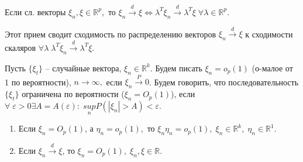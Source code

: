 \begin{lemma}\label{lec:14/lemm:1}
    Если сл. векторы $\xi_n, \xi \in \mathbb{R}^p,$ то $\xi_n \stackrel{d}{\to} \xi  \Longleftrightarrow \lambda^T\xi_n \stackrel{d}{\to} \lambda^T\xi \; \forall \lambda \in \mathbb{R}^p.$
\end{lemma}

Этот прием сводит сходимость по распределению векторов $\xi_n \stackrel{d}{\to} \xi$ к сходимости скаляров $\forall \lambda \; \lambda^T\xi_n \stackrel{d}{\to} \lambda^T\xi.$

\begin{conseq}
    Пусть $\lbrace \xi_t \rbrace$ -- случайные вектора, $\xi_n \in \mathbb{R}^k.$ Будем писать $\xi_n = o_p(1)$ (о-малое от 1 по вероятности), $n \to \infty,$ если $\xi_n \stackrel{P}{\to} 0$. 
    Будем говорить, что последовательность $\lbrace \xi_t \rbrace$ ограничена по вероятности  ($\xi_n = O_p(1)$), если $\forall \; \varepsilon > 0 \exists A = A(\varepsilon): \; \underset{n}{sup}P(|\xi_n| > A) < \varepsilon.$
\end{conseq}

\begin{problem}
    \begin{enumerate}
        \item Если $\xi_n = O_p(1)$, а $\eta_n = o_p(1),$ то $\xi_n\eta_n = o_p(1), \; \xi_n \in \mathbb{R}^k, \; \eta_n \in \mathbb{R}^1.$
        \item Если $\xi_n \stackrel{d}{\to} \xi$, то $\xi_n = O_p(1), \; \xi_n, \xi \in \mathbb{R}.$
    \end{enumerate}
\end{problem}

